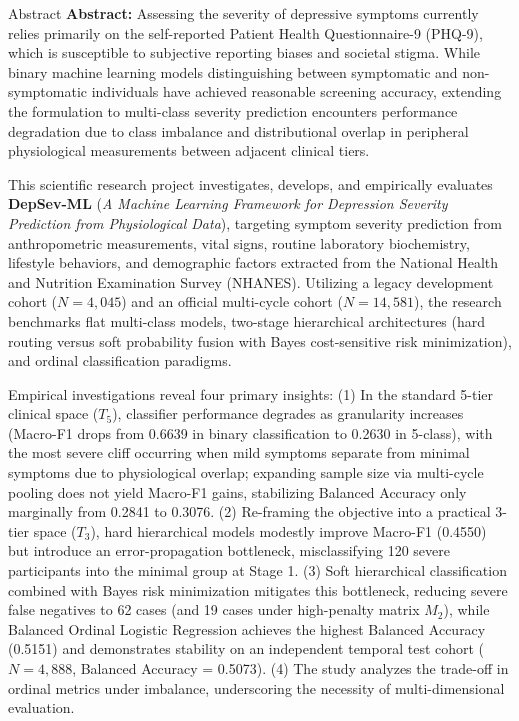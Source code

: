 \documentclass{uetgraduation}
\begin{document}
\begin{preamble}{Abstract}
\textbf{Abstract:} Assessing the severity of depressive symptoms currently relies primarily on the self-reported Patient Health Questionnaire-9 (PHQ-9), which is susceptible to subjective reporting biases and societal stigma. While binary machine learning models distinguishing between symptomatic and non-symptomatic individuals have achieved reasonable screening accuracy, extending the formulation to multi-class severity prediction encounters performance degradation due to class imbalance and distributional overlap in peripheral physiological measurements between adjacent clinical tiers.

This scientific research project investigates, develops, and empirically evaluates \textbf{DepSev-ML} (\textit{A Machine Learning Framework for Depression Severity Prediction from Physiological Data}), targeting symptom severity prediction from anthropometric measurements, vital signs, routine laboratory biochemistry, lifestyle behaviors, and demographic factors extracted from the National Health and Nutrition Examination Survey (NHANES). Utilizing a legacy development cohort ($N = 4,045$) and an official multi-cycle cohort ($N = 14,581$), the research benchmarks flat multi-class models, two-stage hierarchical architectures (hard routing versus soft probability fusion with Bayes cost-sensitive risk minimization), and ordinal classification paradigms.

Empirical investigations reveal four primary insights: (1) In the standard 5-tier clinical space ($T_5$), classifier performance degrades as granularity increases (Macro-F1 drops from 0.6639 in binary classification to 0.2630 in 5-class), with the most severe cliff occurring when mild symptoms separate from minimal symptoms due to physiological overlap; expanding sample size via multi-cycle pooling does not yield Macro-F1 gains, stabilizing Balanced Accuracy only marginally from 0.2841 to 0.3076. (2) Re-framing the objective into a practical 3-tier space ($T_3$), hard hierarchical models modestly improve Macro-F1 (0.4550) but introduce an error-propagation bottleneck, misclassifying 120 severe participants into the minimal group at Stage 1. (3) Soft hierarchical classification combined with Bayes risk minimization mitigates this bottleneck, reducing severe false negatives to 62 cases (and 19 cases under high-penalty matrix $M_2$), while Balanced Ordinal Logistic Regression achieves the highest Balanced Accuracy (0.5151) and demonstrates stability on an independent temporal test cohort ($N = 4,888$, Balanced Accuracy = 0.5073). (4) The study analyzes the trade-off in ordinal metrics under imbalance, underscoring the necessity of multi-dimensional evaluation.


\end{preamble}
\end{document}
